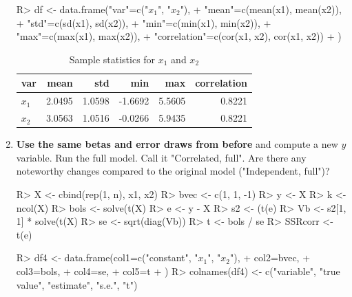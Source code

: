 \documentclass[11pt,reqno]{article}   %
\begin{document}
\begin{enumerate}
\begin{Schunk}
\begin{Sinput}
R> df <- data.frame("var"=c("$x_1$", "$x_2$"),
+                  "mean"=c(mean(x1), mean(x2)),
+                  "std"=c(sd(x1), sd(x2)),
+                  "min"=c(min(x1), min(x2)),
+                  "max"=c(max(x1), max(x2)),
+                  "correlation"=c(cor(x1, x2), cor(x1, x2))
+                  )
\end{Sinput}
\end{Schunk}

\begin{table}[!h]
\centering
\caption{Sample statistics for $x_1$ and $x_2$} 
\begin{tabular}{lrrrrr}
  \hline
var & mean & std & min & max & correlation \\ 
  \hline
$x_1$ & 2.0495 & 1.0598 & -1.6692 & 5.5605 & 0.8221 \\ 
  $x_2$ & 3.0563 & 1.0516 & -0.0266 & 5.9435 & 0.8221 \\ 
   \hline
\end{tabular}
\end{table}\item
\textbf{Use the same betas and error draws from before} and compute a new $y$ variable.
Run the full model. Call it "Correlated, full". Are there any noteworthy changes compared to the original model ("Independent, full")?
\begin{Schunk}
\begin{Sinput}
R> X <- cbind(rep(1, n), x1, x2)
R> bvec <- c(1, 1, -1)
R> y <- X %
R> k <- ncol(X)
R> bols <- solve(t(X) %
R> e <- y - X %
R> s2 <- (t(e) %
R> Vb <- s2[1, 1] * solve(t(X) %
R> se <- sqrt(diag(Vb))
R> t <- bols / se
R> SSRcorr <- t(e) %
\end{Sinput}
\end{Schunk}

\begin{Schunk}
\begin{Sinput}
R> df4 <- data.frame(col1=c("constant", "$x_1$", "$x_2$"),
+                  col2=bvec,
+                  col3=bols,
+                  col4=se,
+                  col5=t
+                  )
R> colnames(df4) <- c("variable", "true value", "estimate", "s.e.", "t")
\end{Sinput}
\end{Schunk}


\end{enumerate}
\end{document}
